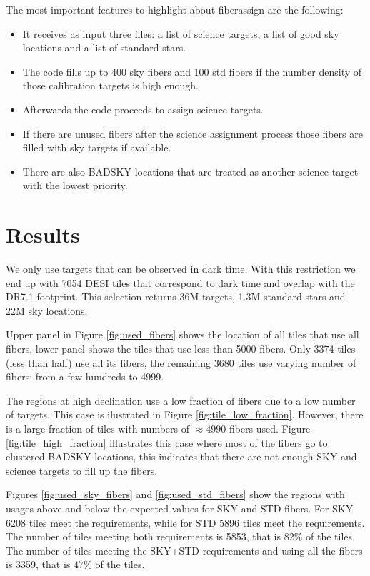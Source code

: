 \documentclass{article}
\begin{document}
The most important features to highlight about fiberassign are the
following:

\begin{itemize}
\item It receives as input three files: a list of science targets, a
  list of good sky locations and a list of standard
  stars. 
\item The code fills up to 400 sky fibers and 100 std fibers if the
  number density of those calibration targets is high enough.
\item Afterwards the code proceeds to assign science targets.
\item If there are unused fibers after the science assignment process
  those fibers are filled with sky targets if available.
\item There are also BADSKY locations that are treated as another
  science target with the lowest priority.
\end{itemize}

\section{Results}


We only use targets that can be observed in dark time. 
With this restriction we end up with 7054 DESI tiles that correspond
to dark time and overlap with the DR7.1 footprint. 
This selection returns 36M targets, 1.3M standard stars and
22M sky locations.

Upper panel in Figure \ref{fig:used_fibers} shows the location of all
tiles that use all fibers, lower panel shows the tiles that use less
than 5000 fibers.
Only 3374 tiles (less than half) use all its fibers, the remaining
3680 tiles use varying number of fibers: from a few hundreds to 4999. 

The regions at high declination use a low fraction of fibers due to a
low number of targets. 
This case is ilustrated in Figure
\ref{fig:tile_low_fraction}. 
However, there is a large fraction of tiles with numbers of $\approx
4990$ fibers used.
Figure \ref{fig:tile_high_fraction} illustrates this case  where most
of the fibers go to clustered BADSKY locations, this indicates that
there are not enough SKY and science targets to fill up the fibers.



Figures \ref{fig:used_sky_fibers} and \ref{fig:used_std_fibers} show
the regions with usages above and below the expected values for SKY
and STD fibers.
For SKY 6208 tiles meet the requirements, while for STD 5896 tiles
meet the requirements. 
The number of tiles meeting both requirements is 5853, that is $82\%$ of
the tiles.
The number of tiles meeting the SKY+STD requirements and using all the
fibers is 3359, that is $47\%$ of the tiles.
\end{document}
